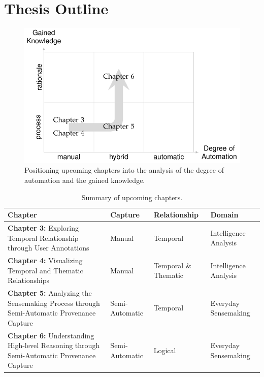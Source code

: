 
\section{Thesis Outline} 

\begin{figure}[!htb]
	\centering
	\includegraphics{work}
	\caption{Positioning upcoming chapters into the analysis of the degree of automation and the gained knowledge.}
	\label{fig:work}
\end{figure}


\begin{table}[!htb]
	\centering
	\sffamily\small
	\caption{Summary of upcoming chapters.}
	\label{table:dataset}
	\begin{tabularx}{\columnwidth}{YL{.1\columnwidth}L{.15\columnwidth}L{.16\columnwidth}}
		\toprule
		\textbf{Chapter} & \textbf{Capture} & \textbf{Relationship} & \textbf{Domain} \\ 
		\midrule
		\textbf{Chapter 3:} Exploring Temporal Relationship through User Annotations & Manual & Temporal & Intelligence Analysis \\ \addlinespace
		\textbf{Chapter 4:} Visualizing Temporal and Thematic Relationships & Manual & Temporal \& Thematic & Intelligence Analysis \\ \addlinespace
		\textbf{Chapter 5:} Analyzing the Sensemaking Process through Semi-Automatic Provenance Capture & Semi-Automatic & Temporal & Everyday Sensemaking \\ \addlinespace
		\textbf{Chapter 6:}  Understanding High-level Reasoning through Semi-Automatic Provenance Capture & Semi-Automatic & Logical & Everyday Sensemaking \\ 
		\bottomrule
	\end{tabularx} 
\end{table}


